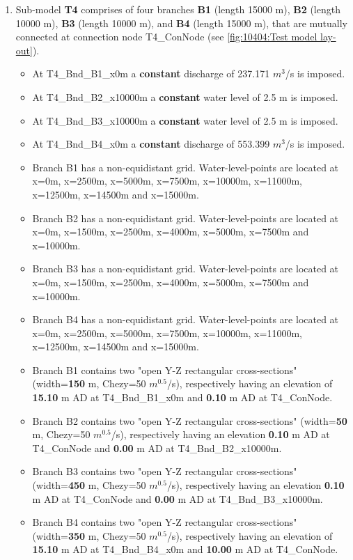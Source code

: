 \begin{enumerate}
	\item Sub-model \textbf{\textcolor[rgb]{1,0,0}{T4}} comprises of four branches \textbf{B1} (length 15000 m), \textbf{B2} (length 10000 m), \textbf{B3} (length 10000 m), and \textbf{B4} (length 15000 m), that are mutually connected at connection node T4\_ConNode (see \autoref{fig:10404:Test model lay-out}).
		\begin{itemize}
			\item At T4\_Bnd\_B1\_x0m a \textbf{constant} discharge of 237.171 $m^3$/s is imposed.
			\item At T4\_Bnd\_B2\_x10000m a \textbf{constant} water level of 2.5 m is imposed.
			\item At T4\_Bnd\_B3\_x10000m a \textbf{constant} water level of 2.5 m is imposed.
			\item At T4\_Bnd\_B4\_x0m a \textbf{constant} discharge of 553.399 $m^3$/s is imposed.
			\item Branch B1 has a non-equidistant grid. Water-level-points are located at x=0m, x=2500m, x=5000m, x=7500m, x=10000m, x=11000m, x=12500m, x=14500m and x=15000m.
			\item Branch B2 has a non-equidistant grid. Water-level-points are located at x=0m, x=1500m, x=2500m, x=4000m, x=5000m, x=7500m and x=10000m.
			\item Branch B3 has a non-equidistant grid. Water-level-points are located at x=0m, x=1500m, x=2500m, x=4000m, x=5000m, x=7500m and x=10000m.
			\item Branch B4 has a non-equidistant grid. Water-level-points are located at x=0m, x=2500m, x=5000m, x=7500m, x=10000m, x=11000m, x=12500m, x=14500m and x=15000m.
			\item Branch B1 contains two "open Y-Z rectangular cross-sections" (width=\textbf{\textcolor[rgb]{0.5,0,0.15}{150}} m, Chezy=50 $m^{0.5}$/s), respectively having an elevation of \textbf{15.10} m AD at T4\_Bnd\_B1\_x0m and \textbf{0.10} m AD at T4\_ConNode. 
			\item Branch B2 contains two "open Y-Z rectangular cross-sections" (width=\textbf{\textcolor[rgb]{0.5,0,0.15}{50}} m, Chezy=50 $m^{0.5}$/s), respectively having an elevation \textbf{0.10} m AD at T4\_ConNode and \textbf{0.00} m AD at \newline T4\_Bnd\_B2\_x10000m.
			\item Branch B3 contains two "open Y-Z rectangular cross-sections" (width=\textbf{\textcolor[rgb]{0.5,0,0.15}{450}} m, Chezy=50 $m^{0.5}$/s), respectively having an elevation \textbf{0.10} m AD at T4\_ConNode and \textbf{0.00} m AD at T4\_Bnd\_B3\_x10000m.
			\item Branch B4 contains two "open Y-Z rectangular cross-sections" (width=\textbf{\textcolor[rgb]{0.5,0,0.15}{350}} m, Chezy=50 $m^{0.5}$/s), respectively having an elevation of \textbf{15.10} m AD at T4\_Bnd\_B4\_x0m and \textbf{10.00} m AD at T4\_ConNode.
		\end{itemize}
		

\end{enumerate}
